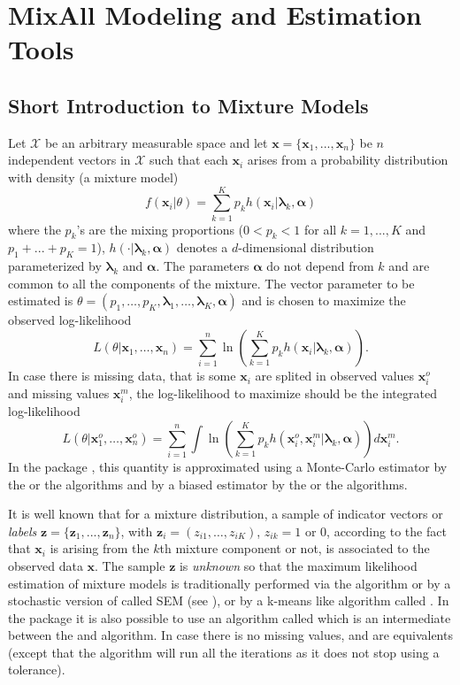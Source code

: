 \documentclass[shortnames,nojss,article]{jss}
\newcommand{\X}{{\mathcal{X}}}
\newcommand{\bx}{\mathbf{x}}
\newcommand{\bz}{\mathbf{z}}
\newcommand{\balpha}{\boldsymbol{\alpha}}
\newcommand{\blambda}{\boldsymbol{\lambda}}
\begin{document}
\section{MixAll Modeling and Estimation Tools}
\label{sec:MixtureTools}

\subsection{Short Introduction to Mixture Models}
Let $\X$ be an arbitrary measurable space and let ${\bx}=\{{\bx}_1,...,{\bx}_n\}$
be $n$ independent vectors in $\X$ such that each ${\bx}_i$ arises from a
probability distribution with density (a mixture model)
\begin{equation}
  f({\bx}_i|\theta) = \sum_{k=1}^K p_k h({\bx}_{i}| \blambda_{k},\balpha)
\end{equation}
where the $p_k$'s are the mixing proportions ($0<p_k<1$ for all $k=1,...,K$ and
$p_1+...+p_K=1$), $h(\cdot| \blambda_{k},\balpha)$ denotes a $d$-dimensional
distribution parameterized by $\blambda_k$ and $\balpha$. The parameters
$\balpha$ do not depend from $k$ and are common to all the components of the
mixture. The vector parameter to be estimated is
$\theta=(p_1,\ldots,p_K,\blambda_1,\ldots,\blambda_K, \balpha)$ and is chosen
to maximize the observed log-likelihood
\begin{equation}
  \label{eq:vraisemblance}
  L(\theta|\bx_1,\ldots,\bx_n)=\sum_{i=1}^n \ln \left(\sum_{k=1}^K p_k h(\bx_i|\blambda_k, \balpha)\right).
\end{equation}
In case there is missing data, that is some $\bx_i$ are splited in observed
values $\bx_i^o$ and missing values $\bx^m_i$, the log-likelihood to maximize
should be the integrated log-likelihood
\begin{equation}
  \label{eq:vraisemblanceIntegrated}
  L(\theta|\bx_1^o,\ldots,\bx_n^o)=
  \sum_{i=1}^n  \int
  \ln \left(\sum_{k=1}^K p_k h(\bx_i^o,\bx_i^m|\blambda_k, \balpha)\right)
  d\bx_i^m.
\end{equation}
In the package , this quantity is approximated using a Monte-Carlo
estimator by the  or the  algorithms and by a biased
estimator by the  or the  algorithms.

It is well known that for a mixture distribution, a sample of indicator vectors
or {\em labels} ${\bz}=\{ {\bz}_1,...,{\bz}_n\}$, with
${\bz}_i=(z_{i1},\ldots,z_{iK})$, $z_{ik}=1$ or 0, according to the fact that
${\bx}_i$ is arising from the $k$th mixture component or not, is associated to
the observed data ${\bx}$. The sample ${\bz}$ is {\em unknown} so that the
maximum likelihood estimation of mixture models is traditionally performed via
the  algorithm \cite{Dempster97} or by a stochastic version of
 called SEM (see \cite{McLachlanPeel00}), or by a k-means like
algorithm called . In the  package it is also possible to
use an algorithm called  which is an intermediate between the
 and  algorithm. In case there is no missing values,
 and  are equivalents (except that the 
algorithm will run all the iterations as it does not stop using a tolerance).
\end{document}
